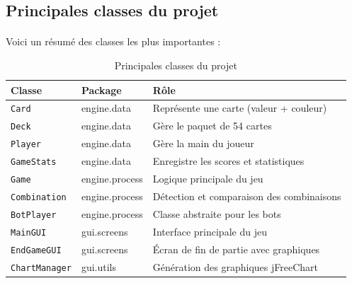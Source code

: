 \subsection{Principales classes du projet}
\paragraph{} Voici un résumé des classes les plus importantes :

\begin{table}[h!]
\centering
\begin{tabular}{|l|l|p{6cm}|}
\hline
\textbf{Classe} & \textbf{Package} & \textbf{Rôle} \\
\hline
\texttt{Card} & engine.data & Représente une carte (valeur + couleur) \\
\texttt{Deck} & engine.data & Gère le paquet de 54 cartes \\
\texttt{Player} & engine.data & Gère la main du joueur \\
\texttt{GameStats} & engine.data & Enregistre les scores et statistiques \\
\hline
\texttt{Game} & engine.process & Logique principale du jeu \\
\texttt{Combination} & engine.process & Détection et comparaison des combinaisons \\
\texttt{BotPlayer} & engine.process & Classe abstraite pour les bots \\
\hline
\texttt{MainGUI} & gui.screens & Interface principale du jeu \\
\texttt{EndGameGUI} & gui.screens & Écran de fin de partie avec graphiques \\
\texttt{ChartManager} & gui.utils & Génération des graphiques jFreeChart \\
\hline
\end{tabular}
\caption{Principales classes du projet}
\label{tab:classes}
\end{table}

